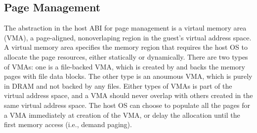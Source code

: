 \subsection{Page Management}
\label{sec:abi:memory}




The abstraction in the host ABI for page management
is a virtaul memory area (VMA), a page-aligned, nonoverlaping region
in the guest's virtual address space.
A virtual memory area
specifies the memory region that requires the host OS to allocate the page resources,
either statically or dynamically.
There are two types of VMAs: one is a file-backed VMA, which is created by  and backs the memory pages with file data blocks.
The other type is an anoumous VMA, which is purely in DRAM and not backed by any files.
Either types of VMAs is part of the virtual address space,
and a VMA should never overlap with others created in the same virtual address space.
The host OS can choose to populate all the pages for a VMA immediately at creation of the VMA,
or delay the allocation until the first memory access (i.e., demand paging).










